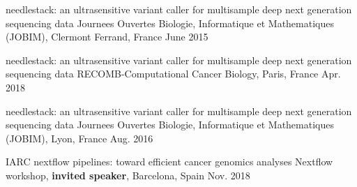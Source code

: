 \begin{cventries}
 
  \cvpublicationentry
    {} %
    {needlestack: an ultra­sensitive variant caller for multi­sample deep next
generation sequencing data} %
    {Journees Ouvertes Biologie, Informatique et Mathematiques (JOBIM), Clermont Ferrand, France} %
    {}
    {June 2015} %
    {} %

  \cvpublicationentry
    {} %
    {needlestack: an ultra­sensitive variant caller for multi­sample deep next
generation sequencing data} %
    {RECOMB-Computational Cancer Biology, Paris, France} %
    {}
    {Apr. 2018} %
    {} %

 
  \cvpublicationentry
    {} %
    {needlestack: an ultra­sensitive variant caller for multi­sample deep next
generation sequencing data} %
    {Journees Ouvertes Biologie, Informatique et Mathematiques (JOBIM), Lyon, France} %
    {}
    {Aug. 2016} %
    {} %

  \cvpublicationentry
    {} %
    {IARC nextflow pipelines: toward efficient cancer genomics analyses} %
    {Nextflow workshop, \textbf{invited speaker}, Barcelona, Spain} %
    {}
    {Nov. 2018} %
    {} %

\end{cventries}

